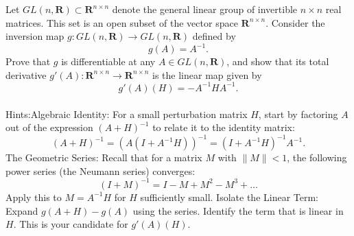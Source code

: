 \begin{problem}
    Let $GL(n, \mathbf{R}) \subset \mathbf{R}^{n \times n}$ denote the general linear group of invertible $n \times n$ real matrices. This set is an open subset of the vector space $\mathbf{R}^{n \times n}$. Consider the inversion map $g: GL(n, \mathbf{R}) \to GL(n, \mathbf{R})$ defined by$$g(A) = A^{-1}.$$Prove that $g$ is  differentiable at any $A \in GL(n, \mathbf{R})$, and show that its total derivative $g'(A): \mathbf{R}^{n \times n} \to \mathbf{R}^{n \times n}$ is the linear map given by$$g'(A)(H) = -A^{-1} H A^{-1}.$$\\
 Hints:Algebraic Identity: For a small perturbation matrix $H$, start by factoring $A$ out of the expression $(A+H)^{-1}$ to relate it to the identity matrix:$$(A+H)^{-1} = (A(I + A^{-1}H))^{-1} = (I + A^{-1}H)^{-1} A^{-1}.$$ The Geometric Series: Recall that for a matrix $M$ with $\|M\| < 1$, the following power series (the Neumann series) converges:$$(I + M)^{-1} = I - M + M^2 - M^3 + \dots$$Apply this to $M = A^{-1}H$ for $H$ sufficiently small. Isolate the Linear Term: Expand $g(A+H) - g(A)$ using the series. Identify the term that is linear in $H$. This is your candidate for $g'(A)(H)$.
\end{problem}

